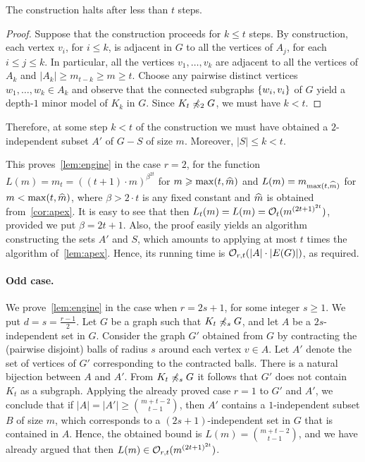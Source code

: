 \begin{claim}\label{claim:at-most-t}
	The construction halts after less than $t$ steps.
\end{claim}
\begin{proof}
Suppose that the construction proceeds for $k\le t$ steps.
By construction, each vertex $v_i$, for $i\le k$, is adjacent in $G$
 to all the vertices of $A_{j}$, for each $i\le j\le k$. In particular, all the vertices $v_1,\ldots,v_k$ are adjacent to all the vertices of $A_{k}$
 and $|A_k|\ge m_{t-k}\ge m\ge t$.
Choose any pairwise distinct vertices $w_1,\ldots,w_k\in A_k$ and observe that the connected subgraphs $\{w_i,v_i\}$ of $G$ yield a depth-$1$ minor model of $K_k$ in $G$.
 Since $K_t\not\preccurlyeq_2 G$, we must have $k<t$.
 \end{proof}
 
 Therefore, at some step $k<t$ of the construction we must have obtained a $2$-independent subset $A'$ of $G-S$ of size $m$. Moreover, $|S|\le k<t$.
 
 
 
 This proves~\cref{lem:engine} in the case $r=2$, for the function $L(m)=m_t=((t+1)\cdot m)^{\beta^{2t}}$
 for $m\geqslant \max(t,\widehat{m})$ and $L(m)=m_{\max(t,\widehat{m})}$ for $m<\max(t,\widehat{m})$, where $\beta>2\cdot t$ is any fixed constant and $\widehat{m}$ is obtained from~\cref{cor:apex}.
 It is easy to see that then $L_t(m)=L(m)=\mathcal{O}_{t}{(m^{{(2t+1)}^{2t}})}$, provided we put $\beta=2t+1$.
 Also, the proof easily yields an algorithm constructing the sets $A'$ and $S$,
 which amounts to applying at most $t$ times the algorithm of~\cref{lem:apex}.
 Hence, its running time  is $\mathcal{O}_{r,t}(|A|\cdot |E(G)|)$, as required.


\paragraph{Odd case.}
We prove~\cref{lem:engine} in the case when $r=2s+1$, for some integer $s\geq 1$. We put $d=s=\frac{r-1}{2}$.
Let $G$ be a graph such that $K_t\not\preccurlyeq_s G$, and 
 let $A$ be a $2s$-independent set in $G$. Consider the graph $G'$ obtained from $G$
by contracting the (pairwise disjoint) balls of radius $s$ around each vertex $v\in A$.
 Let $A'$ denote the set of vertices of $G'$ corresponding to the contracted balls. There is a natural bijection between $A$ and $A'$.
From $K_t\not\preccurlyeq_s G$ it follows that $G'$ does not contain $K_t$ as a subgraph. Applying the already proved case $r=1$ to $G'$ and $A'$, we conclude that 
if $|A|=|A'|\ge {m+t-2\choose t-1}$, then
 $A'$ contains a $1$-independent subset $B$ of size $m$,
 which corresponds to a $(2s+1)$-independent set in $G$ that is contained in $A$.
 Hence, the obtained bound is $L(m)={m+t-2\choose t-1}$, and we have already argued that then $L(m)\in \mathcal{O}_{r,t}{(m^{{(2t+1)}^{2t}})}$.
 
